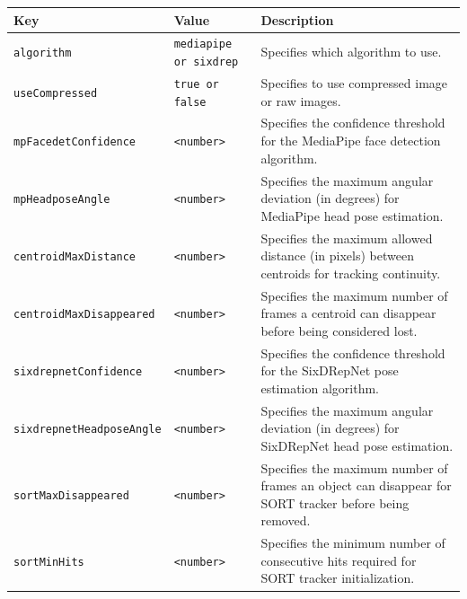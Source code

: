 \documentclass{CSSRforAfrica}
\begin{document}
{\begin{table}[h!]
	\centering
	\begin{tabularx}{\linewidth}{| l | l | X|}
		\hline
		\rowcolor{blue!20} %
		\textbf{Key} & \textbf{Value} & \textbf{Description} \\
		\hline
		{\footnotesize \texttt{algorithm}}             & {\footnotesize \texttt{mediapipe or sixdrep}}   & {\small Specifies which algorithm to use.} \\
		\hline
		{\footnotesize \texttt{useCompressed}}          & {\footnotesize \texttt{true or false}}         & {\small Specifies to use compressed image or raw images.} \\
		\hline
		{\footnotesize \texttt{mpFacedetConfidence}}    & {\footnotesize \texttt{<number>}}              & {\small Specifies the confidence threshold for the MediaPipe face detection algorithm.} \\
		\hline
		{\footnotesize \texttt{mpHeadposeAngle}}        & {\footnotesize \texttt{<number>}}              & {\small Specifies the maximum angular deviation (in degrees) for MediaPipe head pose estimation.} \\
		\hline
		{\footnotesize \texttt{centroidMaxDistance}}    & {\footnotesize \texttt{<number>}}              & {\small Specifies the maximum allowed distance (in pixels) between centroids for tracking continuity.} \\
		\hline
		{\footnotesize \texttt{centroidMaxDisappeared}} & {\footnotesize \texttt{<number>}}              & {\small Specifies the maximum number of frames a centroid can disappear before being considered lost.} \\
		\hline
		{\footnotesize \texttt{sixdrepnetConfidence}}   & {\footnotesize \texttt{<number>}}              & {\small Specifies the confidence threshold for the SixDRepNet pose estimation algorithm.} \\
		\hline
		{\footnotesize \texttt{sixdrepnetHeadposeAngle}}& {\footnotesize \texttt{<number>}}              & {\small Specifies the maximum angular deviation (in degrees) for SixDRepNet head pose estimation.} \\
		\hline
		{\footnotesize \texttt{sortMaxDisappeared}}     & {\footnotesize \texttt{<number>}}              & {\small Specifies the maximum number of frames an object can disappear for SORT tracker before being removed.} \\
		\hline
		{\footnotesize \texttt{sortMinHits}}            & {\footnotesize \texttt{<number>}}              & {\small Specifies the minimum number of consecutive hits required for SORT tracker initialization.} \\

\end{tabularx}
\end{table}}
\end{document}

